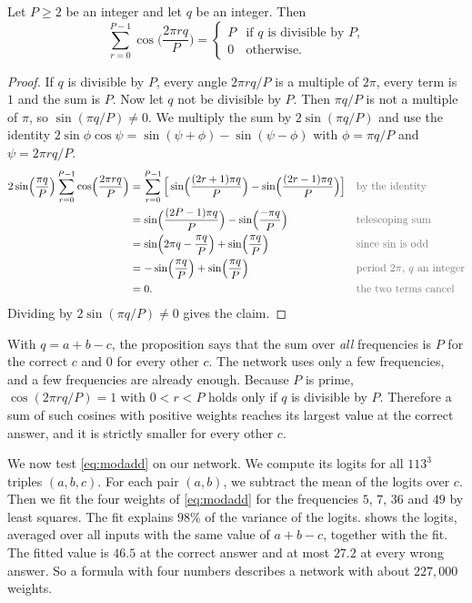 \begin{proposition}\label{prop:cos}
Let $P\ge2$ be an integer and let $q$ be an integer. Then
\[
\sum_{r=0}^{P-1}\cos\!\Big(\frac{2\pi rq}{P}\Big)=\begin{cases}P&\text{if $q$ is divisible by $P$,}\\ 0&\text{otherwise.}\end{cases}
\]
\end{proposition}
\begin{proof}
If $q$ is divisible by $P$, every angle $2\pi rq/P$ is a multiple of $2\pi$, every term is $1$ and the sum is
$P$. Now let $q$ not be divisible by $P$. Then $\pi q/P$ is not a multiple of $\pi$, so $\sin(\pi q/P)\ne0$.
We multiply the sum by $2\sin(\pi q/P)$ and use the identity $2\sin\phi\cos\psi=\sin(\psi+\phi)-\sin(\psi-\phi)$
with $\phi=\pi q/P$ and $\psi=2\pi rq/P$.
\begin{align*}
2\sin\!\Big(\frac{\pi q}{P}\Big)\sum_{r=0}^{P-1}\cos\!\Big(\frac{2\pi rq}{P}\Big)
&= \sum_{r=0}^{P-1}\Big[\sin\!\Big(\frac{(2r+1)\pi q}{P}\Big)-\sin\!\Big(\frac{(2r-1)\pi q}{P}\Big)\Big] && \by{by the identity}\\
&= \sin\!\Big(\frac{(2P-1)\pi q}{P}\Big)-\sin\!\Big(\frac{-\pi q}{P}\Big) && \by{telescoping sum}\\
&= \sin\!\Big(2\pi q-\frac{\pi q}{P}\Big)+\sin\!\Big(\frac{\pi q}{P}\Big) && \by{since $\sin$ is odd}\\
&= -\sin\!\Big(\frac{\pi q}{P}\Big)+\sin\!\Big(\frac{\pi q}{P}\Big) && \by{period $2\pi$, $q$ an integer}\\
&= 0. && \by{the two terms cancel}
\end{align*}
Dividing by $2\sin(\pi q/P)\ne0$ gives the claim.
\end{proof}

With $q=a+b-c$, the proposition says that the sum over \emph{all} frequencies is $P$ for the correct $c$ and $0$
for every other $c$. The network uses only a few frequencies, and a few frequencies are already enough. Because $P$
is prime, $\cos(2\pi rq/P)=1$ with $0<r<P$ holds only if $q$ is divisible by $P$. Therefore a sum of such cosines
with positive weights reaches its largest value at the correct answer, and it is strictly smaller for every other
$c$.

\begin{experiment}\label{exp:modaddlogits} 
We now test \eqref{eq:modadd} on our network. We compute its logits for all $113^3$ triples $(a,b,c)$. For each
pair $(a,b)$, we subtract the mean of the logits over $c$. Then we fit the four weights of \eqref{eq:modadd} for the
frequencies $5$, $7$, $36$ and $49$ by least squares. The fit explains $98\%$ of the variance of the logits.
 shows the logits, averaged over all inputs with the same value of $a+b-c$, together with the
fit. The fitted value is $46.5$ at the correct answer and at most $27.2$ at every wrong answer. So a formula with
four numbers describes a network with about $227{,}000$ weights.
\end{experiment}

